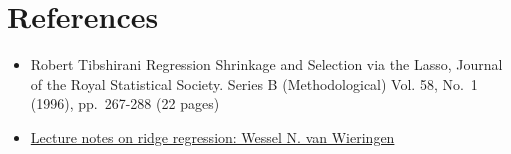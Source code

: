 \documentclass[
]{article}
\providecommand{\tightlist}{%
  \setlength{\itemsep}{0pt}\setlength{\parskip}{0pt}}
\begin{document}
\hypertarget{references}{%
\section{References}\label{references}}

\begin{itemize}
\tightlist
\item
  Robert Tibshirani Regression Shrinkage and Selection via the Lasso,
  Journal of the Royal Statistical Society. Series B (Methodological)
  Vol. 58, No.~1 (1996), pp.~267-288 (22 pages)
\item
  \href{https://arxiv.org/pdf/1509.09169.pdf}{Lecture notes on ridge
  regression: Wessel N. van Wieringen}
\end{itemize}
\end{document}
